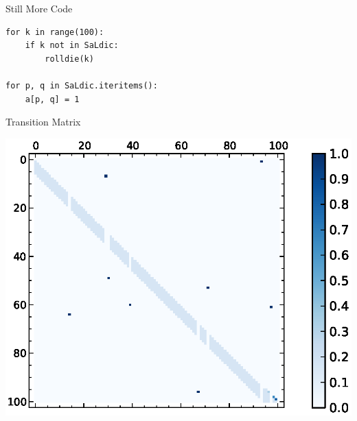 \documentclass[14pt]{beamer}
\begin{document}
\begin{frame}[fragile]{Still More Code}
  \begin{verbatim}
for k in range(100):
    if k not in SaLdic:
        rolldie(k)

for p, q in SaLdic.iteritems():
    a[p, q] = 1
  \end{verbatim}
\end{frame}

\begin{frame}{Transition Matrix}
    \begin{center}
      \includegraphics[scale=0.8]{images/matplot}
    \end{center}
\end{frame}
\end{document}
